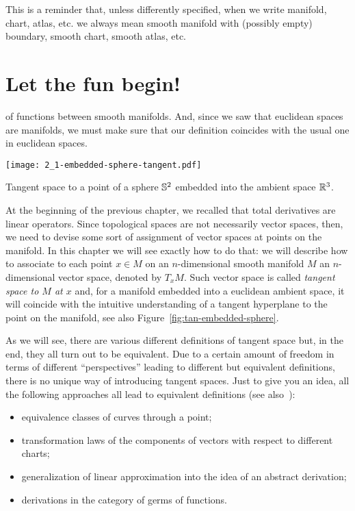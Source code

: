 
\begin{tcolorbox}
  This is a reminder that, unless differently specified, when we write manifold, chart, atlas, etc. we always mean smooth manifold with (possibly empty) boundary, smooth chart, smooth atlas, etc.
\end{tcolorbox}

\section{Let the fun begin!}
 of functions between smooth manifolds.
And, since we saw that euclidean spaces are manifolds, we must make sure that our definition coincides with the usual one in euclidean spaces.

\begin{marginfigure}[7em]
  \texttt{[image: 2\_1-embedded-sphere-tangent.pdf]}
  \label{fig:tan-embedded-sphere}
  \caption{Tangent space to a point of a sphere $\mathbb{S}^2$ embedded into the ambient space $\mathbb{R}^3$.}
\end{marginfigure}
At the beginning of the previous chapter, we recalled that total derivatives are linear operators.
Since topological spaces are not necessarily vector spaces, then, we need to devise some sort of assignment of vector spaces at points on the manifold.
In this chapter we will see exactly how to do that: we will describe how to associate to each point $x\in M$ on an $n$-dimensional smooth manifold $M$ an $n$-dimensional vector space, denoted by $T_x M$.
Such vector space is called \emph{tangent space to $M$ at $x$} and, for a manifold embedded into a euclidean ambient space, it will coincide with the intuitive understanding of a tangent hyperplane to the point on the manifold, see also Figure~\ref{fig:tan-embedded-sphere}.

As we will see, there are various different definitions of tangent space but, in the end, they all turn out to be equivalent.
Due to a certain amount of freedom in terms of different ``perspectives'' leading to different but equivalent definitions, there is no unique way of introducing tangent spaces.
Just to give you an idea, all the following approaches all lead to equivalent definitions (see also~\cite{book:lee}):
\begin{itemize}
  \item equivalence classes of curves through a point;
  \item transformation laws of the components of vectors with respect to different charts;
  \item generalization of linear approximation into the idea of an abstract derivation;
  \item derivations in the category of germs of functions.
\end{itemize}

